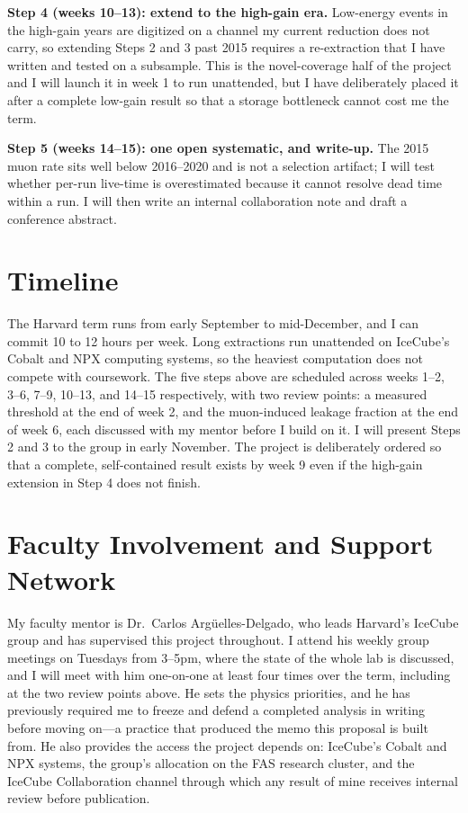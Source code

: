\documentclass[12pt,letterpaper]{article}
\begin{document}
\noindent\textbf{Step 4 (weeks 10--13): extend to the high-gain era.} Low-energy
events in the high-gain years are digitized on a channel my current reduction does not
carry, so extending Steps 2 and 3 past 2015 requires a re-extraction that I have
written and tested on a subsample. This is the novel-coverage half of the project and I
will launch it in week 1 to run unattended, but I have deliberately placed it after a
complete low-gain result so that a storage bottleneck cannot cost me the term.

\noindent\textbf{Step 5 (weeks 14--15): one open systematic, and write-up.} The 2015
muon rate sits well below 2016--2020 and is not a selection artifact; I will test
whether per-run live-time is overestimated because it cannot resolve dead time within a
run. I will then write an internal collaboration note and draft a conference abstract.

\section{Timeline}

The Harvard term runs from early September to mid-December, and I can commit 10 to 12
hours per week. Long extractions run unattended on IceCube's Cobalt and NPX computing
systems, so the heaviest computation does not compete with coursework. The five steps
above are scheduled across weeks 1--2, 3--6, 7--9, 10--13, and 14--15 respectively,
with two review points: a measured threshold at the end of week 2, and the
muon-induced leakage fraction at the end of week 6, each discussed with my mentor
before I build on it. I will present Steps 2 and 3 to the group in early November. The
project is deliberately ordered so that a complete, self-contained result exists by
week 9 even if the high-gain extension in Step 4 does not finish.

\section{Faculty Involvement and Support Network}

My faculty mentor is Dr.\ Carlos Arg\"uelles-Delgado, who leads Harvard's IceCube group
and has supervised this project throughout. I attend his weekly group meetings on
Tuesdays from 3--5pm, where the state of the whole lab is discussed, and I will meet
with him one-on-one at least four times over the term, including at the two review
points above. He sets the physics priorities, and he has previously required me to
freeze and defend a completed analysis in writing before moving on---a practice that
produced the memo this proposal is built from. He also provides the access the project
depends on: IceCube's Cobalt and NPX systems, the group's allocation on the FAS
research cluster, and the IceCube Collaboration channel through which any result of
mine receives internal review before publication.
\end{document}
